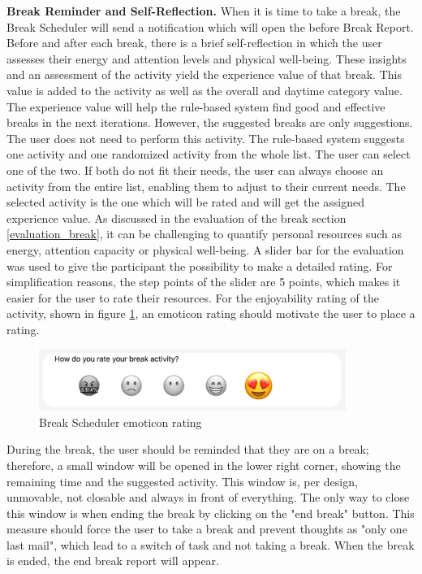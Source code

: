 \documentclass{hasel_thesis}
\begin{document}
\textbf{Break Reminder and Self-Reflection.} When it is time to take a break, the Break Scheduler will send a notification which will open the before Break Report. Before and after each break, there is a brief self-reflection in which the user assesses their energy and attention levels and physical well-being. These insights and an assessment of the activity yield the experience value of that break. This value is added to the activity as well as the overall and daytime category value. The experience value will help the rule-based system find good and effective breaks in the next iterations. However, the suggested breaks are only suggestions. The user does not need to perform this activity. The rule-based system suggests one activity and one randomized activity from the whole list. The user can select one of the two. If both do not fit their needs, the user can always choose an activity from the entire list, enabling them to adjust to their current needs. The selected activity is the one which will be rated and will get the assigned experience value. As discussed in the evaluation of the break section \ref{evaluation_break}, it can be challenging to quantify personal resources such as energy, attention capacity or physical well-being. A slider bar for the evaluation was used to give the participant the possibility to make a detailed rating. For simplification reasons, the step points of the slider are 5 points, which makes it easier for the user to rate their resources. For the enjoyability rating of the activity, shown in figure \ref{fig:rating}, an emoticon rating should motivate the user to place a rating.

\begin{figure}[htp]
    \centering
    \includegraphics[width=10cm]{hasel_thesis/images/rating.png}
    \caption{Break Scheduler emoticon rating}
    \label{fig:rating}
\end{figure}

During the break, the user should be reminded that they are on a break; therefore, a small window will be opened in the lower right corner, showing the remaining time and the suggested activity. This window is, per design, unmovable, not closable and always in front of everything. The only way to close this window is when ending the break by clicking on the "end break" button. This measure should force the user to take a break and prevent thoughts as "only one last mail", which lead to a switch of task and not taking a break. When the break is ended, the end break report will appear.
\end{document}
